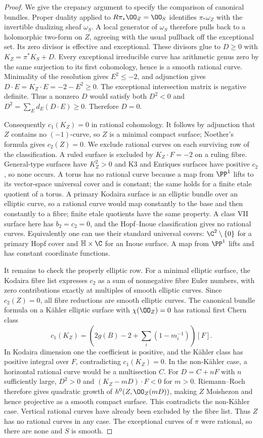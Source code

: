 \begin{proof}
We give the crepancy argument to specify the comparison of canonical bundles. Proper duality applied to $R\pi_*\OO_Z=\OO_S$ identifies $\pi_*\omega_Z$ with the invertible dualizing sheaf $\omega_S$. A local generator of $\omega_S$ therefore pulls back to a holomorphic two-form on $Z$, agreeing with the usual pullback off the exceptional set. Its zero divisor is effective and exceptional. These divisors glue to $D\ge0$ with $K_Z=\pi^*K_S+D$. Every exceptional irreducible curve has arithmetic genus zero by the same surjection to its first cohomology, hence is a smooth rational curve. Minimality of the resolution gives $E^2\le-2$, and adjunction gives $D\cdot E=K_Z\cdot E=-2-E^2\ge0$. The exceptional intersection matrix is negative definite. Thus a nonzero $D$ would satisfy both $D^2<0$ and $D^2=\sum_E d_E(D\cdot E)\ge0$. Therefore $D=0$.

Consequently $c_1(K_Z)=0$ in rational cohomology. It follows by adjunction that $Z$ contains no $(-1)$-curve, so $Z$ is a minimal compact surface; Noether's formula gives $c_2(Z)=0$. We exclude rational curves on each surviving row of the classification. A ruled surface is excluded by $K_Z\cdot F=-2$ on a ruling fibre. General-type surfaces have $K_Z^2>0$ and K3 and Enriques surfaces have positive $c_2$, so none occurs. A torus has no rational curve because a map from $\PP^1$ lifts to its vector-space universal cover and is constant; the same holds for a finite etale quotient of a torus. A primary Kodaira surface is an elliptic bundle over an elliptic curve, so a rational curve would map constantly to the base and then constantly to a fibre; finite etale quotients have the same property. A class VII surface here has $b_2=c_2=0$, and the Hopf--Inoue classification gives no rational curves. Equivalently one can use their standard universal covers: $\C^2\setminus\{0\}$ for a primary Hopf cover and $\mathbb H\times\C$ for an Inoue surface. A map from $\PP^1$ lifts and has constant coordinate functions.

It remains to check the properly elliptic row. For a minimal elliptic surface, the Kodaira fibre list expresses $c_2$ as a sum of nonnegative fibre Euler numbers, with zero contributions exactly at multiples of smooth elliptic curves. Since $c_2(Z)=0$, all fibre reductions are smooth elliptic curves. The canonical bundle formula on a Kähler elliptic surface with $\chi(\OO_Z)=0$ has rational first Chern class
\[
 c_1(K_Z)=\left(2g(B)-2+\sum_i(1-m_i^{-1})\right)[F].
\]
In Kodaira dimension one the coefficient is positive, and the Kähler class has positive integral over $F$, contradicting $c_1(K_Z)=0$. In the non-Kähler case, a horizontal rational curve would be a multisection $C$. For $D=C+nF$ with $n$ sufficiently large, $D^2>0$ and $(K_Z-mD)\cdot F<0$ for $m>0$. Riemann--Roch therefore gives quadratic growth of $h^0(Z,\OO_Z(mD))$, making $Z$ Moishezon and hence projective as a smooth compact surface. This contradicts the non-Kähler case. Vertical rational curves have already been excluded by the fibre list. Thus $Z$ has no rational curves in any case. The exceptional curves of $\pi$ were rational, so there are none and $S$ is smooth.


\end{proof}
